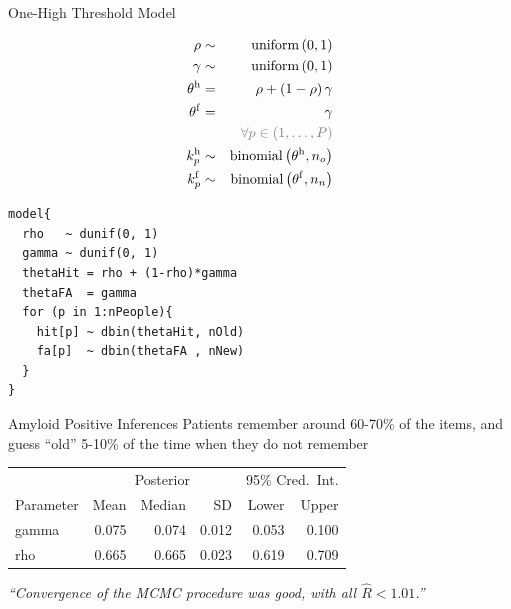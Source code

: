 \documentclass[10pt]{beamer}
\begin{document}
\begin{frame}[fragile]{One-High Threshold Model}
	
\begin{minipage}{0.45\textwidth}
\begin{eqnarray*}
	\rho &\sim& \operatorname{uniform}\left(0, 1\right) \\
\gamma &\sim&\operatorname{uniform}\left(0, 1\right) \\
 \theta^\mathrm{h} &=& {\rho} + {\left(1-\rho\right)\gamma} \\
 \theta^\mathrm{f} &=& {\gamma} \\
 &&{\color{gray}\forall p \in (1,\ldots,P)}\\
 k^\mathrm{h}_p &\sim& \operatorname{binomial}\left(\theta^\mathrm{h}, n_o\right) \\
 k^\mathrm{f}_p &\sim& \operatorname{binomial}\left(\theta^\mathrm{f}, n_n\right) 
\end{eqnarray*}
\end{minipage}\hfill
\begin{minipage}{0.45\textwidth}
\begin{verbatim}
model{
  rho   ~ dunif(0, 1)
  gamma ~ dunif(0, 1)
  thetaHit = rho + (1-rho)*gamma
  thetaFA  = gamma
  for (p in 1:nPeople){
    hit[p] ~ dbin(thetaHit, nOld)
    fa[p]  ~ dbin(thetaFA , nNew)
  }
}
\end{verbatim}
\end{minipage}\hspace{1cm}

\end{frame}



\begin{frame}[fragile]{Amyloid Positive Inferences}
Patients remember around {\color{red}60-70\%} of the items, and guess ``old'' {\color{darkgreen}5-10\%} of the time when they do not remember

\begin{table}[h]
	\centering
		\begin{tabular}{lrrrrr}
			\toprule
			\multicolumn{1}{c}{} & \multicolumn{3}{c}{Posterior} & \multicolumn{2}{c}{95\% Cred.\ Int.}  \\
			\cline{2-4}\cline{5-6}
			Parameter & Mean & Median & SD & Lower & Upper   \\
			\cmidrule[0.4pt]{1-6}
			gamma & 0.075 & 0.074 & 0.012 & {\color{darkgreen}0.053} & {\color{darkgreen}0.100}   \\
			rho   & 0.665 & 0.665 & 0.023 & {\color{red}      0.619} & {\color{red}      0.709}  \\
			\bottomrule
		\end{tabular}
\end{table}\pause

\textit{``Convergence of the MCMC procedure was good, with all $\hat{R} < 1.01$.''}

\end{frame}
\end{document}
